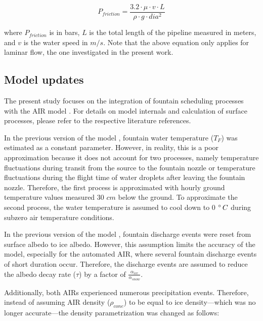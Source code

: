 \documentclass[tc, manuscript]{copernicus}
\begin{document}
\begin{equation}
  \label{eqn:friction}
  P_{friction} = \frac{3.2 \cdot \mu \cdot v \cdot L}{\rho \cdot g \cdot dia^2}
\end{equation}

where $P_{friction}$ is in bars, $L$ is the total length of the pipeline measured in meters, and $v$ is the water speed in
$m/s$. Note that the above equation only applies for laminar flow, the one investigated in the present work.


\subsection{Model updates}

The present study focuses on the integration of fountain scheduling processes with the AIR model
\citep{balasubramanianInfluenceMeteorologicalConditions2022}. For details on model internals and calculation of
surface processes, please refer to the respective literature references. 

In the previous version of the model \citep{balasubramanianInfluenceMeteorologicalConditions2022}, fountain
water temperature ($T_F$) was estimated as a constant parameter. However, in reality, this is a poor
approximation because it does not account for two processes, namely temperature fluctuations during transit from
the source to the fountain nozzle or temperature fluctuations during the flight time of water droplets after
leaving the fountain nozzle. Therefore, the first process is approximated with hourly ground temperature values
measured 30 $cm$ below the ground. To approximate the second process, the water temperature is assumed to cool
down to 0 $^{\circ}\,C$ during subzero air temperature conditions.

In the previous version of the model \citep{balasubramanianInfluenceMeteorologicalConditions2022}, fountain
discharge events were reset from surface albedo to ice albedo. However, this assumption limits the accuracy of
the model, especially for the automated AIR, where several fountain discharge events of short duration occur.
Therefore, the discharge events are assumed to reduce the albedo decay rate ($\tau$) by a factor of
$\frac{\alpha_{ice}}{\alpha_{snow}}$.

Additionally, both AIRs experienced numerous precipitation events. Therefore, instead of assuming AIR density
($\rho_{cone}$) to be equal to ice density---which was no longer accurate---the density
parametrization was changed as follows:
\end{document}
